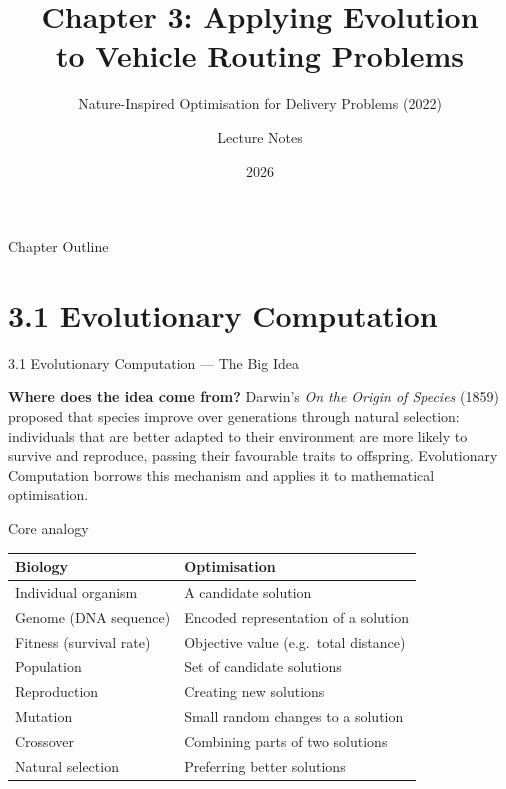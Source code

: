 \documentclass[aspectratio=169,10pt]{beamer}
\title[Ch.3 Evolutionary VRP]{Chapter 3: Applying Evolution\\to Vehicle Routing Problems}
\subtitle{Nature-Inspired Optimisation for Delivery Problems (2022)}
\author{Lecture Notes}
\date{2026}
\begin{document}
\begin{frame}
  \titlepage
\end{frame}

\begin{frame}{Chapter Outline}
  \tableofcontents
\end{frame}

\section{3.1 Evolutionary Computation}

\begin{frame}[allowframebreaks]{3.1 Evolutionary Computation — The Big Idea}

  \textbf{Where does the idea come from?}
  Darwin's \emph{On the Origin of Species} (1859) proposed that species improve over generations
  through natural selection: individuals that are better adapted to their environment are more
  likely to survive and reproduce, passing their favourable traits to offspring.
  Evolutionary Computation borrows this mechanism and applies it to mathematical optimisation.

  \medskip
  \begin{block}{Core analogy}
    \begin{tabular}{ll}
      \toprule
      \textbf{Biology}        & \textbf{Optimisation}              \\
      \midrule
      Individual organism     & A candidate solution               \\
      Genome (DNA sequence)   & Encoded representation of a solution \\
      Fitness (survival rate) & Objective value (e.g.\ total distance) \\
      Population              & Set of candidate solutions         \\
      Reproduction            & Creating new solutions             \\
      Mutation                & Small random changes to a solution \\
      Crossover               & Combining parts of two solutions   \\
      Natural selection       & Preferring better solutions        \\
      \bottomrule
    \end{tabular}
  \end{block}


\end{frame}
\end{document}
